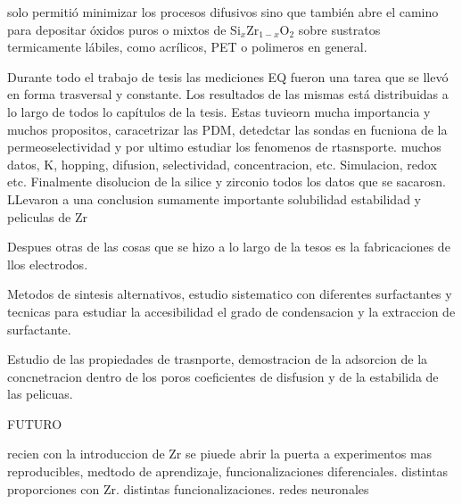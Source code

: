 solo permitió minimizar los procesos difusivos sino que también abre el camino para depositar óxidos puros o mixtos de Si$_x$Zr$_{1-x}$O$_2$ sobre sustratos termicamente lábiles, como acrílicos, PET o polimeros en general.

Durante todo el trabajo de tesis las mediciones EQ fueron una tarea que se llevó en forma trasversal y constante. Los resultados de las mismas está distribuidas a lo largo de todos lo capítulos de la tesis.  Estas tuvieorn mucha importancia y muchos propositos, caracetrizar las PDM, detedctar las sondas en fucniona de la permeoselectividad y por ultimo estudiar los fenomenos de rtasnsporte.
muchos datos, K, hopping, difusion, selectividad, concentracion, etc. Simulacion, redox etc. Finalmente disolucion de la silice y zirconio
todos los datos que se sacarosn. LLevaron a una conclusion sumamente importante solubilidad estabilidad y peliculas de Zr

Despues otras de las cosas que se hizo a lo largo de la tesos es la fabricaciones de llos electrodos.


Metodos de sintesis alternativos, estudio sistematico con diferentes surfactantes y tecnicas para estudiar la accesibilidad el grado de condensacion y la extraccion de surfactante.

Estudio de las propiedades de trasnporte, demostracion de la adsorcion de la concnetracion dentro de los poros coeficientes de disfusion y de la estabilida de las pelicuas.



FUTURO

recien con la introduccion de Zr se piuede abrir la puerta a experimentos mas reproducibles, medtodo de aprendizaje, funcionalizaciones diferenciales. distintas proporciones con Zr. distintas funcionalizaciones.
redes neuronales

\newpage

